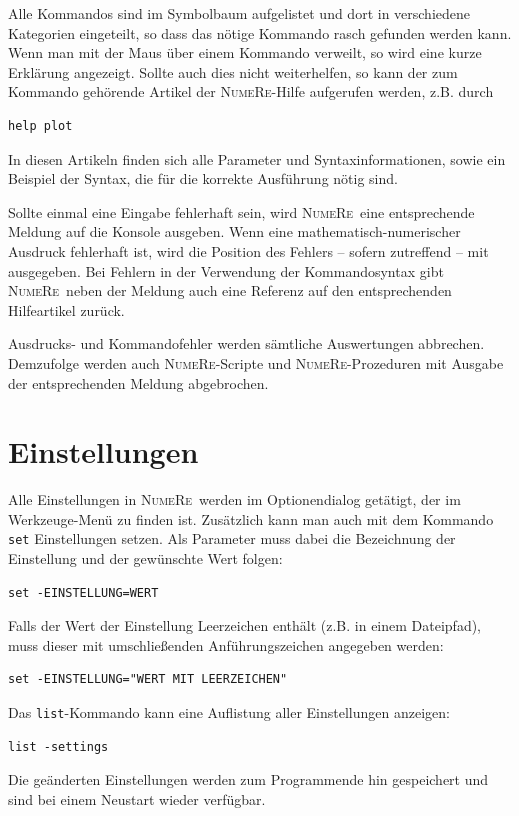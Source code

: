 \documentclass[DIV=14,headsepline,footsepline]{scrbook}
\newcommand{\NR}{\textsc{Nu\-me\-Re}}
\begin{document}
				Alle Kommandos sind im Symbolbaum aufgelistet und dort in verschiedene Kategorien eingeteilt, so dass das nötige Kommando rasch gefunden werden kann. Wenn man mit der Maus über einem Kommando verweilt, so wird eine kurze Erklärung angezeigt. Sollte auch dies nicht weiterhelfen, so kann der zum Kommando gehörende Artikel der \NR-Hilfe aufgerufen werden, z.B. durch
				\begin{lstlisting}
help plot
				\end{lstlisting}
				In diesen Artikeln finden sich alle Parameter und Syntaxinformationen, sowie ein Beispiel der Syntax, die für die korrekte Ausführung nötig sind.
				
				Sollte einmal eine Eingabe fehlerhaft sein, wird \NR\ eine entsprechende Meldung auf die Konsole ausgeben. Wenn eine mathematisch-numerischer Ausdruck fehlerhaft ist, wird die Position des Fehlers -- sofern zutreffend -- mit ausgegeben. Bei Fehlern in der Verwendung der Kommandosyntax gibt \NR\ neben der Meldung auch eine Referenz auf den entsprechenden Hilfeartikel zurück.
				
				Ausdrucks- und Kommandofehler werden sämtliche Auswertungen abbrechen. Demzufolge werden auch \NR-Scripte und \NR-Prozeduren mit Ausgabe der entsprechenden Meldung abgebrochen.
			\section{Einstellungen}
				Alle Einstellungen in \NR\ werden im Optionendialog getätigt, der im Werkzeuge-Menü zu finden ist. Zusätzlich kann man auch mit dem Kommando \lstinline+set+ Einstellungen setzen. Als Parameter muss dabei die Bezeichnung der Einstellung und der gewünschte Wert folgen:
				\begin{lstlisting}
set -EINSTELLUNG=WERT
				\end{lstlisting}
				Falls der Wert der Einstellung Leerzeichen enthält (z.B. in einem Dateipfad), muss dieser mit umschließenden Anführungszeichen angegeben werden:
				\begin{lstlisting}
set -EINSTELLUNG="WERT MIT LEERZEICHEN"
				\end{lstlisting}
				Das \lstinline+list+-Kommando kann eine Auflistung aller Einstellungen anzeigen:
				\begin{lstlisting}
list -settings
				\end{lstlisting}
				Die geänderten Einstellungen werden zum Programmende hin gespeichert und sind bei einem Neustart wieder verfügbar.
\end{document}
